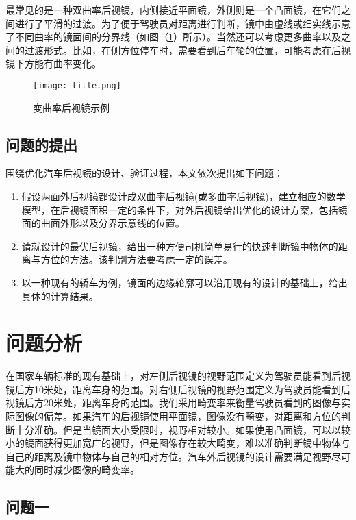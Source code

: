 \documentclass[withoutpreface,bwprint]{cumcmthesis} %
\begin{document}
\par 最常见的是一种双曲率后视镜，内侧接近平面镜，外侧则是一个凸面镜，在它们之间进行了平滑的过渡。为了便于驾驶员对距离进行判断，镜中由虚线或细实线示意了不同曲率的镜面间的分界线（如图（\ref{title}）所示）。当然还可以考虑更多曲率以及之间的过渡形式。比如，在侧方位停车时，需要看到后车轮的位置，可能考虑在后视镜下方能有曲率变化。

\begin{figure}[!htb]
\centering
\texttt{[image: title.png]}
\caption{变曲率后视镜示例}
\label{title}
\end{figure}

\subsection{问题的提出}

围绕优化汽车后视镜的设计、验证过程，本文依次提出如下问题：

\begin{enumerate}
  \item 假设两面外后视镜都设计成双曲率后视镜(或多曲率后视镜)，建立相应的数学模型，在后视镜面积一定的条件下，对外后视镜给出优化的设计方案，包括镜面的曲面外形以及分界示意线的位置。
  \item 请就设计的最优后视镜，给出一种方便司机简单易行的快速判断镜中物体的距离与方位的方法。该判别方法要考虑一定的误差。
  \item 以一种现有的轿车为例，镜面的边缘轮廓可以沿用现有的设计的基础上，给出具体的计算结果。 
\end{enumerate}

\section{问题分析}

\par 在国家车辆标准的现有基础上，对左侧后视镜的视野范围定义为驾驶员能看到后视镜后方10米处，距离车身的范围。对右侧后视镜的视野范围定义为驾驶员能看到后视镜后方20米处，距离车身的范围。我们采用畸变率来衡量驾驶员看到的图像与实际图像的偏差。如果汽车的后视镜使用平面镜，图像没有畸变，对距离和方位的判断十分准确。但是当镜面大小受限时，视野相对较小。如果使用凸面镜，可以以较小的镜面获得更加宽广的视野，但是图像存在较大畸变，难以准确判断镜中物体与自己的距离及镜中物体与自己的相对方位。汽车外后视镜的设计需要满足视野尽可能大的同时减少图像的畸变率。

\subsection{问题一}
\end{document}
